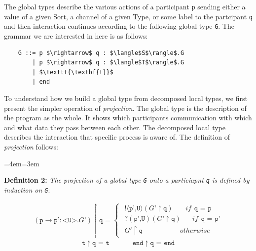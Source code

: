 \documentclass[11pt, abstracton, twoside, titlepage=true]{scrartcl}
\newenvironment{blockquote}{
	\par
	\medskip
	\leftskip=4em\rightskip=3em
	\noindent\ignorespaces
}{
	\par\medskip
}
\begin{document}
The global types describe the various actions of a participant \texttt{p} sending
either a value of a given Sort, a channel of a given Type, or some label to the
partcipant \texttt{q} and then interaction continues according to the following
global type \texttt{G}. The grammar we are interested in here is as follows:
\\
\begin{lstlisting}
    G ::= p $\rightarrow$ q : $\langle$S$\rangle$.G
        | p $\rightarrow$ q : $\langle$T$\rangle$.G
        | $\texttt{\textbf{t}}$
        | end
\end{lstlisting}

To understand how we build a global type from decomposed local types, we first 
present the simpler operation of \emph{projection}. The global type is the
description of the program as the whole. It shows which participants 
communication with which and what data they pass between each other. The decomposed
local type describes the interaction that specific process is aware of. The 
definition of \emph{projection} follows:

\begin{blockquote}
  \textbf{Definition 2:} \emph{The projection of a global type \texttt{G} onto 
  a particiapnt \texttt{q} is defined by induction on \texttt{G}}:
\end{blockquote}
\begin{align*}
  (\texttt{p} \rightarrow \texttt{p'}:\texttt{<U>}.\texttt{$G$'}) \upharpoonright \texttt{q = }  
  \begin{cases}
\hspace{5pt} !\langle \texttt{p',U} \rangle (\texttt{$G$'}\upharpoonright \texttt{q}) \hspace{22pt}if \hspace{5pt} \texttt{q = p} \\
\hspace{5pt} ?(\texttt{p',U}) (\texttt{$G$'}\upharpoonright \texttt{q}) \hspace{20pt}if \hspace{5pt} \texttt{q = p'} \\
\hspace{5pt} \texttt{$G'$}\upharpoonright \texttt{q} \hspace{65pt} otherwise
  \end{cases}
\end{align*}
\begin{align*}
  \texttt{t} \upharpoonright \texttt{q = t} 
  \hspace{40pt} \texttt{end} \upharpoonright \texttt{q = end}
\end{align*}
\end{document}
